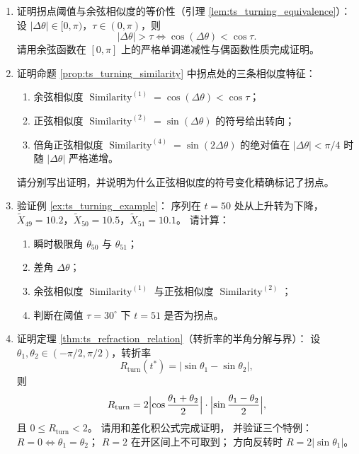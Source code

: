 \begin{enumerate}[leftmargin=3em, label=\textbf{题 \arabic*}]
    \item 证明拐点阈值与余弦相似度的等价性（引理 \ref{lem:ts_turning_equivalence}）：
    设 $|\Delta\theta|\in[0,\pi)$，$\tau\in(0,\pi)$，则
    \[
    |\Delta\theta|>\tau\Longleftrightarrow\cos(\Delta\theta)<\cos\tau.
    \]
    请用余弦函数在 $[0,\pi]$ 上的严格单调递减性与偶函数性质完成证明。

    \item 证明命题 \ref{prop:ts_turning_similarity} 中拐点处的三条相似度特征：
    \begin{enumerate}[label=(\roman*)]
        \item 余弦相似度 $\operatorname{Similarity}^{(1)}=\cos(\Delta\theta)<\cos\tau$；
        \item 正弦相似度 $\operatorname{Similarity}^{(2)}=\sin(\Delta\theta)$ 的符号给出转向；
        \item 倍角正弦相似度 $\operatorname{Similarity}^{(4)}=\sin(2\Delta\theta)$
              的绝对值在 $|\Delta\theta|<\pi/4$ 时随 $|\Delta\theta|$ 严格递增。
    \end{enumerate}
    请分别写出证明，并说明为什么正弦相似度的符号变化精确标记了拐点。

    \item 验证例 \ref{ex:ts_turning_example}：
    序列在 $t=50$ 处从上升转为下降，
    $\tilde{X}_{49}=10.2$，$\tilde{X}_{50}=10.5$，$\tilde{X}_{51}=10.1$。
    请计算：
    \begin{enumerate}[label=(\roman*)]
        \item 瞬时极限角 $\theta_{50}$ 与 $\theta_{51}$；
        \item 差角 $\Delta\theta$；
        \item 余弦相似度 $\operatorname{Similarity}^{(1)}$ 与正弦相似度 $\operatorname{Similarity}^{(2)}$；
        \item 判断在阈值 $\tau=30^\circ$ 下 $t=51$ 是否为拐点。
    \end{enumerate}

    \item 证明定理 \ref{thm:ts_refraction_relation}（转折率的半角分解与界）：
    设 $\theta_1,\theta_2\in(-\pi/2,\pi/2)$，转折率
    \[
    R_{\text{turn}}(t^*)=|\sin\theta_1-\sin\theta_2|,
    \]
    则
    \[
    R_{\text{turn}}=2\Bigl|\cos\frac{\theta_1+\theta_2}{2}\Bigr|
    \cdot\Bigl|\sin\frac{\theta_1-\theta_2}{2}\Bigr|,
    \]
    且 $0\le R_{\text{turn}}<2$。
    请用和差化积公式完成证明，
    并验证三个特例：$R=0\iff\theta_1=\theta_2$；
    $R=2$ 在开区间上不可取到；
    方向反转时 $R=2|\sin\theta_1|$。


\end{enumerate}
